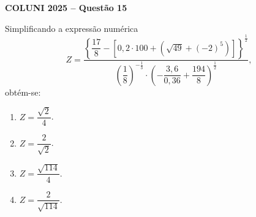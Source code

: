 \textbf{COLUNI 2025 -- Questão 15}\par\medskip Simplificando a expressão numérica
\[
Z=\frac{\left\{\dfrac{17}{8}-\left[0,2\cdot100+\left(\sqrt{49}+(-2)^5\right)\right]\right\}^{\frac12}}{\left(\dfrac18\right)^{-\frac13}\cdot\left(-\dfrac{3,6}{0,36}+\dfrac{194}{8}\right)^{\frac12}},
\]
obtém-se:
\begin{enumerate}
\item $Z=\dfrac{\sqrt{2}}{4}$.
\item $Z=\dfrac{2}{\sqrt{2}}$.
\item $Z=\dfrac{\sqrt{114}}{4}$.
\item $Z=\dfrac{2}{\sqrt{114}}$.
\end{enumerate}
